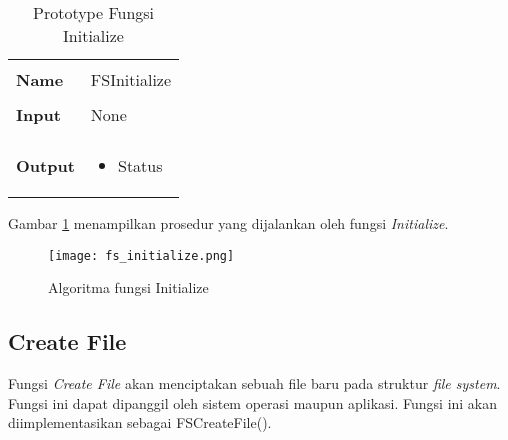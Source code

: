 \documentclass[a4paper, 12pt]{report}
\begin{document}
\begin{table}[htbp]
  \centering
  \begin{tabular}{p{2cm}p{8cm}}
    \hline\\
    {\bf Name} & FSInitialize\\
    \hline\\
    {\bf Input}  & None\\
    \hline\\
    {\bf Output} & 
    \begin{itemize}[noitemsep,topsep=0pt,parsep=0pt,partopsep=0pt]
    \item Status
    \end{itemize}
    \\
    \hline
  \end{tabular}
  \caption{Prototype Fungsi Initialize}
  \label{tbl-initialize}
\end{table}


Gambar \ref{fig-initialize} menampilkan prosedur yang dijalankan oleh fungsi {\em Initialize}.

\begin{figure}[h]
\centering
\texttt{[image: fs\_initialize.png]}
\caption{Algoritma fungsi Initialize}
\label{fig-initialize}
\end{figure}


\subsection{Create File}

Fungsi {\em Create File} akan menciptakan sebuah file baru pada struktur {\em file system}. Fungsi ini dapat dipanggil oleh sistem operasi maupun aplikasi. Fungsi ini akan diimplementasikan sebagai FSCreateFile().
\end{document}
